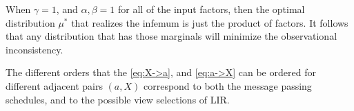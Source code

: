 \documentclass[twoside]{article}
\theoremstyle{plain}
\theoremstyle{definition}
\theoremstyle{remark}
\newcommand\sto{\usebox\stosbox}
\newcommand\mat[1]{\mathbf{#1}}
\newcommand\Msg{\dg{M\mskip-1mus\mskip-2mu g}}
\begin{document}
\begin{lproof} \label{proof:bp}
When $\gamma=1$, and $\alpha, \beta = 1$ for all of the input factors, then the optimal
distribution $\mu^*$ that realizes the infemum is just the product of factors. It follows that any distribution that has those marginals will minimize the observational inconsistency.

The different orders that the \eqref{eq:X->a}, and \eqref{eq:a->X} can be ordered
for different adjacent pairs $(a, X)$ correspond to both the message passing schedules, and to the possible view selections of LIR.
\end{lproof}
\end{document}
